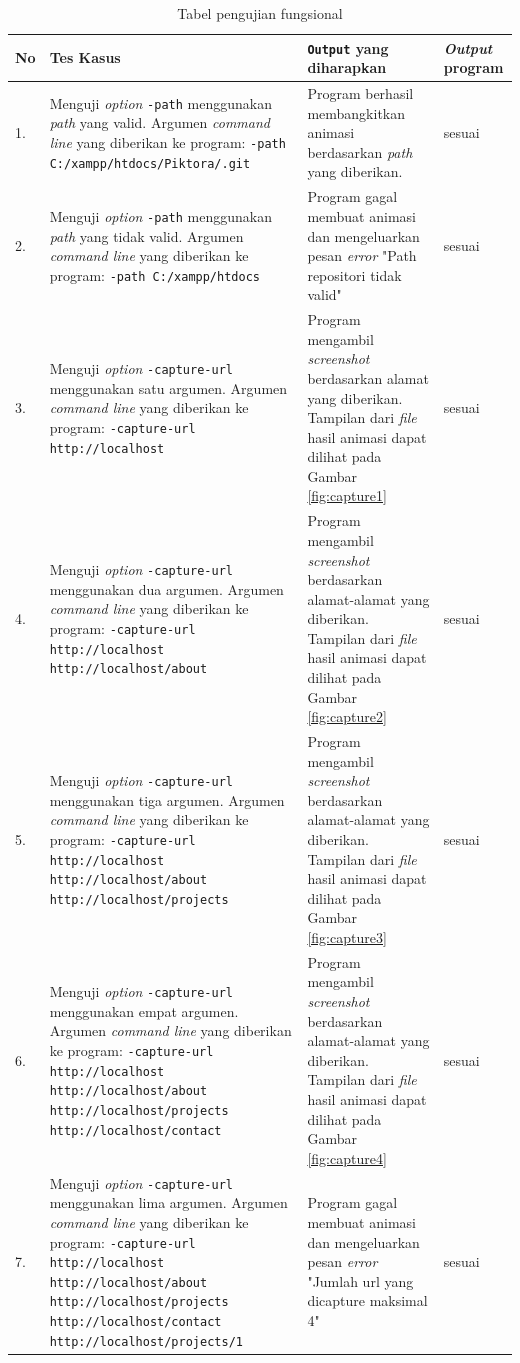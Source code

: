 \begin{table}[htbp]
	\centering
	\caption{Tabel pengujian fungsional}
	
		\begin{tabular}{|p{0.3cm}|>{\raggedright} p{5.5 cm}| p{7 cm}| p{3 cm}|} \hline
		No & Tes Kasus	& \texttt{Output} yang diharapkan & \textit{Output} program \\ \hline
		1. & Menguji \textit{option} \texttt{-path} menggunakan \textit{path} yang valid. Argumen \textit{command line} yang diberikan ke program: \texttt{-path C:/xampp/htdocs/Piktora/.git} & Program berhasil membangkitkan animasi berdasarkan \textit{path} yang diberikan.& sesuai \\ \hline
		2. & Menguji \textit{option} \texttt{-path} menggunakan \textit{path} yang tidak valid. Argumen \textit{command line} yang diberikan ke program: \texttt{-path C:/xampp/htdocs}  & Program gagal membuat animasi dan mengeluarkan pesan \textit{error} "Path repositori tidak valid"  & sesuai \\ \hline
		3. & Menguji \textit{option} \texttt{-capture-url} menggunakan satu argumen. Argumen \textit{command line} yang diberikan ke program:  \texttt{-capture-url http://localhost} & Program mengambil \textit{screenshot} berdasarkan alamat yang diberikan. Tampilan dari \textit{file} hasil animasi dapat dilihat pada Gambar \ref{fig:capture1}  & sesuai	\\ \hline
		4. & Menguji \textit{option} \texttt{-capture-url} menggunakan dua argumen. Argumen \textit{command line} yang diberikan ke program:  \texttt{-capture-url http://localhost http://localhost/about} & Program mengambil \textit{screenshot} berdasarkan alamat-alamat yang diberikan. Tampilan dari \textit{file} hasil animasi dapat dilihat pada Gambar \ref{fig:capture2}  & sesuai \\ \hline
		5. & Menguji \textit{option} \texttt{-capture-url} menggunakan tiga argumen. Argumen \textit{command line} yang diberikan ke program:  \texttt{-capture-url http://localhost http://localhost/about http://localhost/projects} & Program mengambil \textit{screenshot} berdasarkan alamat-alamat yang diberikan. Tampilan dari \textit{file} hasil animasi dapat dilihat pada Gambar \ref{fig:capture3}   & sesuai\\ \hline
		6. & Menguji \textit{option} \texttt{-capture-url} menggunakan empat argumen. Argumen \textit{command line} yang diberikan ke program:  \texttt{-capture-url http://localhost http://localhost/about http://localhost/projects http://localhost/contact} & Program mengambil \textit{screenshot} berdasarkan alamat-alamat yang diberikan. Tampilan dari \textit{file} hasil animasi dapat dilihat pada Gambar \ref{fig:capture4}  & sesuai \\ \hline
		7. & Menguji \textit{option} \texttt{-capture-url} menggunakan lima argumen. Argumen \textit{command line} yang diberikan ke program:  \texttt{-capture-url http://localhost http://localhost/about http://localhost/projects http://localhost/contact http://localhost/projects/1}& Program gagal membuat animasi dan mengeluarkan pesan \textit{error} "Jumlah url yang dicapture maksimal 4" & sesuai \\ \hline
		

\end{tabular}
\end{table}
